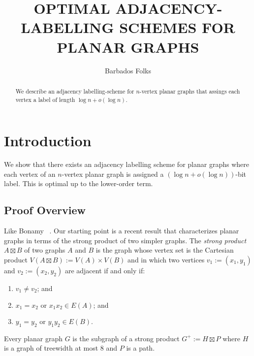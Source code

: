 \documentclass[kpfonts]{patmorin}
\title{\MakeUppercase{Optimal Adjacency-Labelling Schemes for Planar Graphs}}
\author{Barbados Folks}
\begin{document}
\begin{titlepage}
\maketitle

\begin{abstract}
  We describe an adjacency labelling-scheme for $n$-vertex planar graphs that assings each vertex a label of length $\log n+o(\log n)$.
\end{abstract}
\end{titlepage}
\tableofcontents

\newpage

\setcounter{page}{0}
\section{Introduction}

We show that there exists an adjacency labelling scheme for planar graphs where each vertex of an $n$-vertex planar graph is assigned a $(\log n+o(\log n))$-bit label.  This is optimal up to the lower-order term.


\subsection{Proof Overview}

Like Bonamy \etal\ \cite{bonamy.gavoille.ea:shorter}.  Our starting point is a recent result that characterizes planar graphs in terms of the strong product of two simpler graphs.  The \emph{strong product} $A\boxtimes B$ of two graphs $A$ and $B$ is the graph whose vertex set is the Cartesian product $V(A\boxtimes B):=V(A)\times V(B)$ and in which two vertices $v_1:=(x_1,y_1)$ and $v_2:=(x_2,y_2)$ are adjacent if and only if:
\begin{enumerate}
  \item  $v_1\neq v_2$; and
  \item $x_1=x_2$ or $x_1x_2\in E(A)$; and
  \item $y_1=y_2$ or $y_1y_2\in E(B)$.
\end{enumerate}

\begin{thm}
  Every planar graph $G$ is the subgraph of a strong product $G^+:=H\boxtimes P$ where $H$ is a graph of treewidth at most 8 and $P$ is a path.
\end{thm}
\end{document}
